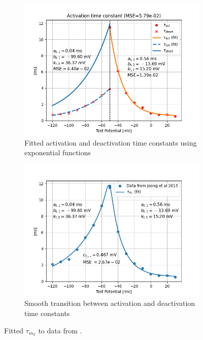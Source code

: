 \documentclass[../../workflow.tex]{subfiles}
\begin{document}
\begin{figure}[H]
    \centering
    \begin{subfigure}[t]{0.45\textwidth}
        \centering
        \includegraphics[width=\textwidth]{./img/t_type_calcium_channel/final_tau_activation_fit.png}
        \caption{Fitted activation and deactivation time constants using exponential functions}
        \label{fig:data_fitted_taus_from_jeong_activation}
    \end{subfigure}
    \hfill
    \begin{subfigure}[t]{0.45\textwidth}
        \centering
        \includegraphics[width=\textwidth]{./img/t_type_calcium_channel/tau_activation_join_exponentials.png}
        \caption{Smooth transition between activation and deactivation time constants}
        \label{fig:data_fitted_tau_m_from_jeong_smooth_transition}
    \end{subfigure}
    
    \caption{Fitted $\tau_{m_T}$ to data from \parencite{jeongCaa1TFlyTtype2015}.}
    \label{fig:data_fitted_taus_from_jeong}
\end{figure}
\end{document}
